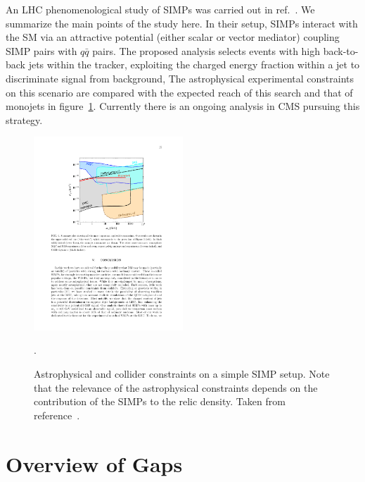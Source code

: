An LHC phenomenological study of SIMPs was carried out in ref.~\cite{Daci:2015hca}. We summarize the main points of the study here. In their setup, SIMPs interact with the SM via an attractive potential (either scalar or vector mediator) coupling SIMP pairs with $q\bar{q}$ pairs. The proposed analysis selects events with high \pT back-to-back jets within the tracker, exploiting the charged energy fraction within a jet to discriminate signal from background,  The astrophysical experimental constraints on this scenario are compared with the expected reach of this search and that of monojets in figure~\ref{fig:simps}. Currently there is an ongoing analysis in CMS pursuing this strategy.

\begin{figure}[htb]
\centering
\includegraphics[width=0.5\textwidth]{plots/simps_constraints.pdf}
\caption{Astrophysical and collider constraints on a simple SIMP setup. Note that the relevance of the astrophysical constraints depends on the contribution of the SIMPs to the relic density. Taken from reference~\cite{Daci:2015hca}.}
  \label{fig:simps}.
\end{figure}


\section{Overview of Gaps}
\label{sec:covgaps}

